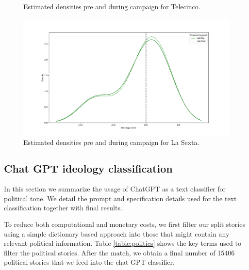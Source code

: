 \documentclass[12pt]{article}
\begin{document}
\begin{figure}[ht]
\begin{minipage}[b]{0.5\linewidth}
		\caption{Estimated densities pre and during campaign for Telecinco.} 
		\vspace{4ex}
	\end{minipage}%
	\begin{minipage}[b]{0.5\linewidth}
		\centering
		\includegraphics[width=1\linewidth]{figures/channel_ideology_density_python_channel_3.pdf} 
		\caption{Estimated densities pre and during campaign for La Sexta.} 
		\vspace{4ex}
	\end{minipage} 
\end{figure}









\subsection{Chat GPT ideology classification}\label{sec:chat_gpt}

In this section we summarize the usage of ChatGPT as a text classifier for political tone. We detail the prompt and specification details used for the text classification together with final results. 




To reduce both computational and monetary costs, we first filter our split stories using a simple dictionary based approach into those that might contain any relevant political information. Table \ref{table:politics} shows the key terms used to filter the political stories. After the match, we obtain a final number of 15406 political stories that we feed into the chat GPT classifier.
\end{document}

